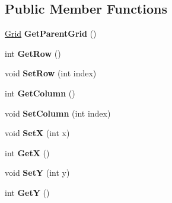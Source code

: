 \subsection*{Public Member Functions}
\begin{DoxyCompactItemize}
\item 
\mbox{\label{class_space_v_i_l_1_1_core_1_1_cell_ae54b94459fbf1265591360bce217325e}} 
\mbox{\hyperlink{class_space_v_i_l_1_1_grid}{Grid}} {\bfseries Get\+Parent\+Grid} ()
\item 
\mbox{\label{class_space_v_i_l_1_1_core_1_1_cell_acfb9d378459d516cdc5cc51cc8c8a732}} 
int {\bfseries Get\+Row} ()
\item 
\mbox{\label{class_space_v_i_l_1_1_core_1_1_cell_a54c7b4a973d3e2057a7b628def4b8495}} 
void {\bfseries Set\+Row} (int index)
\item 
\mbox{\label{class_space_v_i_l_1_1_core_1_1_cell_aa64e9ae1dc6c606f73295ec6d96622e8}} 
int {\bfseries Get\+Column} ()
\item 
\mbox{\label{class_space_v_i_l_1_1_core_1_1_cell_ad65f2cf5cc343c7366e5ce1ff3b87211}} 
void {\bfseries Set\+Column} (int index)
\item 
\mbox{\label{class_space_v_i_l_1_1_core_1_1_cell_a40777648f94f04ef6e8f6017a7258468}} 
void {\bfseries SetX} (int x)
\item 
\mbox{\label{class_space_v_i_l_1_1_core_1_1_cell_aab398475cd935964d5e62be8b5680c34}} 
int {\bfseries GetX} ()
\item 
\mbox{\label{class_space_v_i_l_1_1_core_1_1_cell_a78546d26e3570cb204f84863959f9464}} 
void {\bfseries SetY} (int y)
\item 
\mbox{\label{class_space_v_i_l_1_1_core_1_1_cell_a089716ea070d66a02e9bf1161e320917}} 
int {\bfseries GetY} ()
\item 
\mbox{\label{class_space_v_i_l_1_1_core_1_1_cell_a37629be78ccfe083dc0a6ff5b80fd8a2}} 

\end{DoxyCompactItemize}
